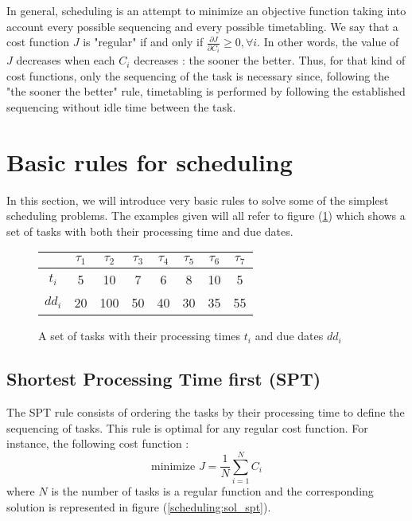 In general, scheduling is an attempt to minimize an objective function taking into account every possible sequencing and every possible timetabling. We say that a cost function $J$ is "regular" if and only if $\frac{\partial J}{\partial C_i}\ge 0,\forall i$. In other words, the value of $J$ decreases when each $C_i$ decreases : the sooner the better. Thus, for that kind of cost functions, only the sequencing of the task is necessary since, following the "the sooner the better" rule, timetabling is performed by following the established sequencing without idle time between the task. 

\section{Basic rules for scheduling}

In this section, we will introduce very basic rules to solve some of the simplest scheduling problems. The examples given will all refer to figure (\ref{scheduling:table}) which shows a set of tasks with both their processing time and due dates. 

\begin{figure}[h!]
    \centering
    \begin{tabular}{|c|c|c|c|c|c|c|c|}
        \hline
         & $\tau_1$ & $\tau_2$ & $\tau_3$ & $\tau_4$ & $\tau_5$ & $\tau_6$ & $\tau_7$ \\\hline
        $t_i$ & 5 & 10 & 7 & 6 & 8 & 10 & 5\\\hline
        $dd_i$ & 20 & 100 & 50 & 40 & 30 & 35 & 55\\\hline
    \end{tabular}
    \caption{\label{scheduling:table}A set of tasks with their processing times $t_i$ and due dates $dd_i$}
\end{figure}

\subsection{Shortest Processing Time first (SPT)}

The SPT rule consists of ordering the tasks by their processing time to define the sequencing of tasks. This rule is optimal for any regular cost function. For instance, the following cost function : \[ \textrm{minimize } J = \frac{1}{N}\sum_{i=1}^N C_i \] where $N$ is the number of tasks is a regular function and the corresponding solution is represented in figure (\ref{scheduling:sol_spt}). 

